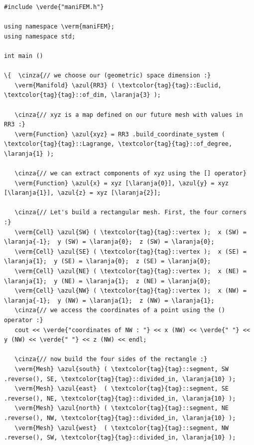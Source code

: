 \begin{Verbatim}[commandchars=\\\{\},formatcom=\small\tt,frame=single,
   label=parag-\ref{\numb section 1.\numb parag 1}.cpp,rulecolor=\color{coment},
   baselinestretch=0.94,framesep=2mm                                            ]
#include \verde{"maniFEM.h"}

using namespace \verm{maniFEM};
using namespace std;

int main ()

\{  \cinza{// we choose our (geometric) space dimension :}
   \verm{Manifold} \azul{RR3} ( \textcolor{tag}{tag}::Euclid, \textcolor{tag}{tag}::of_dim, \laranja{3} );
   
   \cinza{// xyz is a map defined on our future mesh with values in RR3 :}
   \verm{Function} \azul{xyz} = RR3 .build_coordinate_system ( \textcolor{tag}{tag}::Lagrange, \textcolor{tag}{tag}::of_degree, \laranja{1} );

   \cinza{// we can extract components of xyz using the [] operator}
   \verm{Function} \azul{x} = xyz [\laranja{0}], \azul{y} = xyz [\laranja{1}], \azul{z} = xyz [\laranja{2}];

   \cinza{// Let's build a rectangular mesh. First, the four corners :}
   \verm{Cell} \azul{SW} ( \textcolor{tag}{tag}::vertex );  x (SW) = \laranja{-1};  y (SW) = \laranja{0};  z (SW) = \laranja{0};
   \verm{Cell} \azul{SE} ( \textcolor{tag}{tag}::vertex );  x (SE) =  \laranja{1};  y (SE) = \laranja{0};  z (SE) = \laranja{0};
   \verm{Cell} \azul{NE} ( \textcolor{tag}{tag}::vertex );  x (NE) =  \laranja{1};  y (NE) = \laranja{1};  z (NE) = \laranja{0};
   \verm{Cell} \azul{NW} ( \textcolor{tag}{tag}::vertex );  x (NW) = \laranja{-1};  y (NW) = \laranja{1};  z (NW) = \laranja{1};
   \cinza{// we access the coordinates of a point using the () operator :}
   cout << \verde{"coordinates of NW : "} << x (NW) << \verde{" "} << y (NW) << \verde{" "} << z (NW) << endl;

   \cinza{// now build the four sides of the rectangle :}
   \verm{Mesh} \azul{south} ( \textcolor{tag}{tag}::segment, SW .reverse(), SE, \textcolor{tag}{tag}::divided_in, \laranja{10} );
   \verm{Mesh} \azul{east}  ( \textcolor{tag}{tag}::segment, SE .reverse(), NE, \textcolor{tag}{tag}::divided_in, \laranja{10} );
   \verm{Mesh} \azul{north} ( \textcolor{tag}{tag}::segment, NE .reverse(), NW, \textcolor{tag}{tag}::divided_in, \laranja{10} );
   \verm{Mesh} \azul{west}  ( \textcolor{tag}{tag}::segment, NW .reverse(), SW, \textcolor{tag}{tag}::divided_in, \laranja{10} );
   

\end{Verbatim}
